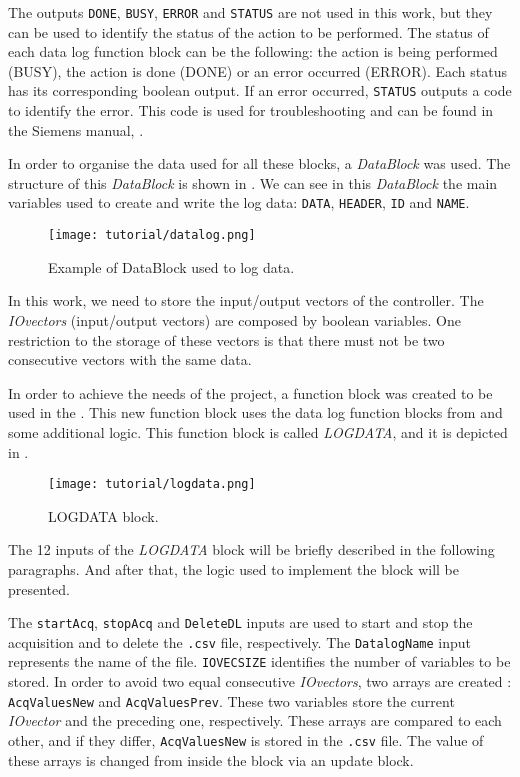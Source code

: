 The outputs \verb|DONE|, \verb|BUSY|, \verb|ERROR| and \verb|STATUS| are not used
in this work, but they can be used to identify the status of the action to be
performed. The status of each data log function block can be the following: the action is being
performed (BUSY), the action is done (DONE) or an error occurred (ERROR). Each
status has its corresponding boolean output. If an error occurred, \verb|STATUS| outputs
a code to identify the error. This code is used for troubleshooting
and can be found in the Siemens manual, \cite{datalogSiemens}.

In order to organise the data used for all these blocks, a \emph{DataBlock} was
used. The structure of this \emph{DataBlock} is shown in . We can see in this \emph{DataBlock} the main variables used to create
and write the log data: \verb|DATA|, \verb|HEADER|, \verb|ID| and \verb|NAME|.


\begin{figure}[H] \centering
 \texttt{[image: tutorial/datalog.png]}
  \caption{Example of DataBlock used to log data.}
  \label{fig:exampleDataBlock}
\end{figure}


In this work, we need to store the input\slash output
vectors of the controller. The \emph{IOvectors} (input\slash output vectors) are composed by
boolean variables. One restriction to the storage of these vectors is that there
must not be two consecutive vectors with the same data.

In order to achieve the needs of the project, a
function block was created to be used in the \LD. This new function block uses
the data log function blocks from  and some additional logic. This function block is called \emph{LOGDATA}, and it is
depicted in
.
\begin{figure}[H] \centering
 \texttt{[image: tutorial/logdata.png]}
  \caption{LOGDATA block.}
  \label{fig:logdataBlock}
\end{figure}
The 12 inputs of the \emph{LOGDATA} block will be briefly described in the following paragraphs. And after that, the logic used to implement the block will be presented.

The \verb|startAcq|,
\verb|stopAcq| and \verb|DeleteDL| inputs are used to start and stop the
acquisition and to
delete the \verb|.csv| file, respectively. The \verb|DatalogName| input represents the name of the file. \verb|IOVECSIZE| identifies the number of variables to
be stored.
In order to avoid two equal consecutive \emph{IOvectors}, two arrays are
created : \verb|AcqValuesNew| and
\verb|AcqValuesPrev|. These two variables store the current \emph{IOvector} and the preceding one, respectively. These arrays are compared to each other, and if
they differ, \verb|AcqValuesNew| is stored in the \verb|.csv| file. 
 The value of these arrays is
changed from inside the block via an update block.

